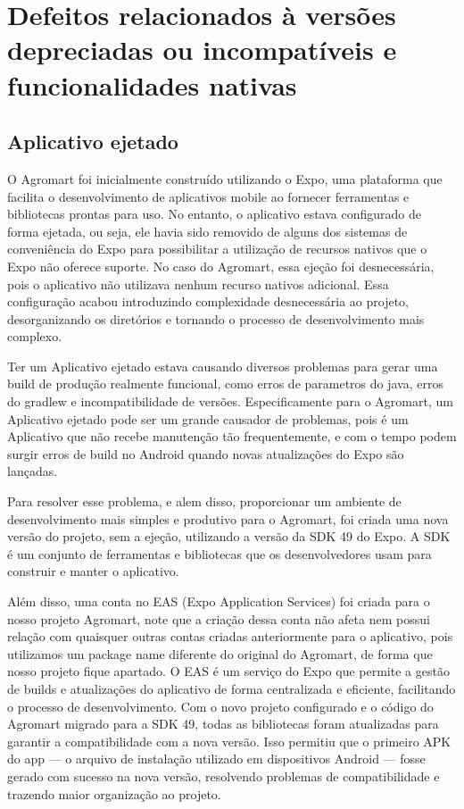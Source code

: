 \section{Defeitos relacionados à versões depreciadas ou incompatíveis e funcionalidades nativas}
\subsection{Aplicativo ejetado}

O Agromart foi inicialmente construído utilizando o Expo, uma plataforma que facilita o desenvolvimento de aplicativos mobile ao fornecer ferramentas e bibliotecas prontas para uso. No entanto, o aplicativo estava configurado de forma ejetada, ou seja, ele havia sido removido de alguns dos sistemas de conveniência do Expo para possibilitar a utilização de recursos nativos que o Expo não oferece suporte. No caso do Agromart, essa ejeção foi desnecessária, pois o aplicativo não utilizava nenhum recurso nativos adicional. Essa configuração acabou introduzindo complexidade desnecessária ao projeto, desorganizando os diretórios e tornando o processo de desenvolvimento mais complexo.

Ter um Aplicativo ejetado estava causando diversos problemas para gerar uma build de produção realmente funcional, como erros de parametros do java, erros do gradlew e incompatibilidade de versões. Especificamente para o Agromart, um Aplicativo ejetado pode ser um grande causador de problemas, pois é um Aplicativo que não recebe manutenção tão frequentemente, e com o tempo podem surgir erros de build no Android quando novas atualizações do Expo são lançadas.

Para resolver esse problema, e alem disso, proporcionar um ambiente de desenvolvimento mais simples e produtivo para o Agromart, foi criada uma nova versão do projeto, sem a ejeção, utilizando a versão da SDK 49 do Expo. A SDK é um conjunto de ferramentas e bibliotecas que os desenvolvedores usam para construir e manter o aplicativo.

Além disso, uma conta no EAS (Expo Application Services) foi criada para o nosso projeto Agromart, note que a criação dessa conta não afeta nem possui relação com quaisquer outras contas criadas anteriormente para o aplicativo, pois utilizamos um package name diferente do original do Agromart, de forma que nosso projeto fique apartado. O EAS é um serviço do Expo que permite a gestão de builds e atualizações do aplicativo de forma centralizada e eficiente, facilitando o processo de desenvolvimento. Com o novo projeto configurado e o código do Agromart migrado para a SDK 49, todas as bibliotecas foram atualizadas para garantir a compatibilidade com a nova versão. Isso permitiu que o primeiro APK do app — o arquivo de instalação utilizado em dispositivos Android — fosse gerado com sucesso na nova versão, resolvendo problemas de compatibilidade e trazendo maior organização ao projeto.

